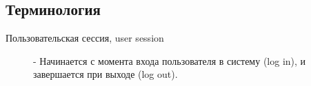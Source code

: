 \subsection{Терминология}
\begin{description}

\item[Пользовательская сессия, user session] - 
    Начинается с момента входа пользователя в систему (log in), и завершается при выходе (log out).
\end{description}

